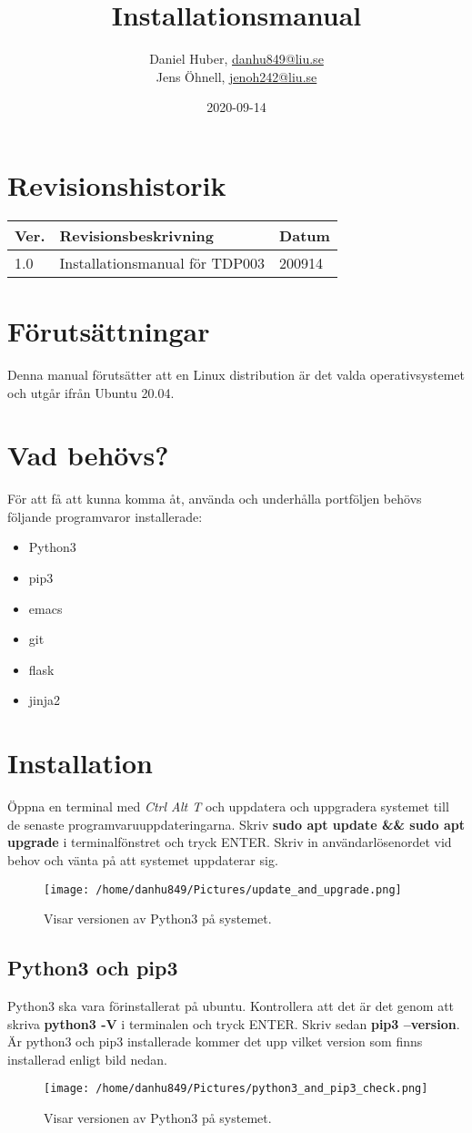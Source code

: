 \documentclass{TDP003mall}
\author{Daniel Huber, \url{danhu849@liu.se}\\
  Jens Öhnell, \url{jenoh242@liu.se}}
\title{Installationsmanual}
\date{2020-09-14}
\begin{document}
\projectpage
\section{Revisionshistorik}
\begin{table}[!h]
\begin{tabularx}{\linewidth}{|l|X|l|}
\hline
Ver. & Revisionsbeskrivning & Datum \\\hline
1.0 & Installationsmanual för TDP003 & 200914 \\\hline
\end{tabularx}
\end{table}

\section{Förutsättningar}
Denna manual förutsätter att en Linux distribution är det valda operativsystemet och utgår ifrån Ubuntu 20.04.

\section{Vad behövs?}
För att få att kunna komma åt, använda och underhålla portföljen behövs följande programvaror installerade:
\begin{itemize}
  \item Python3
  \item pip3
  \item emacs
  \item git
  \item flask
  \item jinja2   
\end{itemize}

\section{Installation}
Öppna en terminal med \emph{Ctrl Alt T} och uppdatera och uppgradera systemet till de senaste programvaruuppdateringarna. Skriv \textbf{sudo apt update \&\& sudo apt upgrade} i terminalfönstret och tryck ENTER. Skriv in användarlösenordet vid behov och vänta på att systemet uppdaterar sig.
\begin{figure}[htbp]
  \centerline{\texttt{[image: /home/danhu849/Pictures/update\_and\_upgrade.png]}}
  \caption{Visar versionen av Python3 på systemet.}
  \label{fig}
\end{figure}

\subsection{Python3 och pip3}
Python3 ska vara förinstallerat på ubuntu. Kontrollera att det är det genom att skriva \textbf{python3 -V} i terminalen och tryck ENTER. Skriv sedan \textbf{pip3 --version}. Är python3 och pip3 installerade kommer det upp vilket version som finns installerad enligt bild nedan.
\begin{figure}[htbp]
  \centerline{\texttt{[image: /home/danhu849/Pictures/python3\_and\_pip3\_check.png]}}
  \caption{Visar versionen av Python3 på systemet.}
  \label{fig}
\end{figure}
\end{document}
